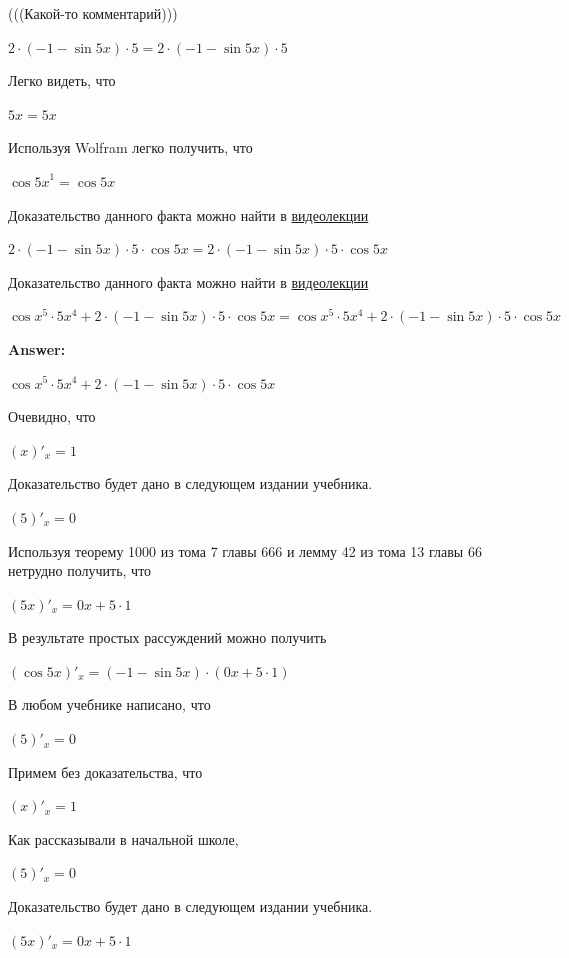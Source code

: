 \documentclass[12pt,a4paper,fleqn]{article}
\theoremstyle{definition}
\begin{document}
(((Какой-то комментарий))) 

$ 2  \cdot ( -1  - \sin 5  x ) \cdot  5  =  2  \cdot ( -1  - \sin 5  x ) \cdot  5 $

Легко видеть, что 

$ 5  x  =  5  x $

Используя Wolfram легко получить, что 

${\cos 5  x }^{ 1 } = \cos 5  x $

Доказательство данного факта можно найти в \href{https://www.youtube.com/watch?v=dQw4w9WgXcQ}{видеолекции} 

$ 2  \cdot ( -1  - \sin 5  x ) \cdot  5  \cdot \cos 5  x  =  2  \cdot ( -1  - \sin 5  x ) \cdot  5  \cdot \cos 5  x $

Доказательство данного факта можно найти в \href{https://www.youtube.com/watch?v=dQw4w9WgXcQ}{видеолекции} 

$\cos{ x }^{ 5 } \cdot  5 { x }^{ 4 } +  2  \cdot ( -1  - \sin 5  x ) \cdot  5  \cdot \cos 5  x  = \cos{ x }^{ 5 } \cdot  5 { x }^{ 4 } +  2  \cdot ( -1  - \sin 5  x ) \cdot  5  \cdot \cos 5  x $


\textbf{Answer:}

$\cos{ x }^{ 5 } \cdot  5 { x }^{ 4 } +  2  \cdot ( -1  - \sin 5  x ) \cdot  5  \cdot \cos 5  x $

Очевидно, что 

$( x )'_{x} =  1 $

Доказательство будет дано в следующем издании учебника. 

$( 5 )'_{x} =  0 $

Используя теорему 1000 из тома 7 главы 666 и лемму 42 из тома 13 главы 66 нетрудно получить, что 

$( 5  x )'_{x} =  0  x  +  5  \cdot  1 $

В результате простых рассуждений можно получить 

$(\cos 5  x )'_{x} = ( -1  - \sin 5  x ) \cdot ( 0  x  +  5  \cdot  1 )$

В любом учебнике написано, что 

$( 5 )'_{x} =  0 $

Примем без доказательства, что 

$( x )'_{x} =  1 $

Как рассказывали в начальной школе, 

$( 5 )'_{x} =  0 $

Доказательство будет дано в следующем издании учебника. 

$( 5  x )'_{x} =  0  x  +  5  \cdot  1 $
\end{document}
